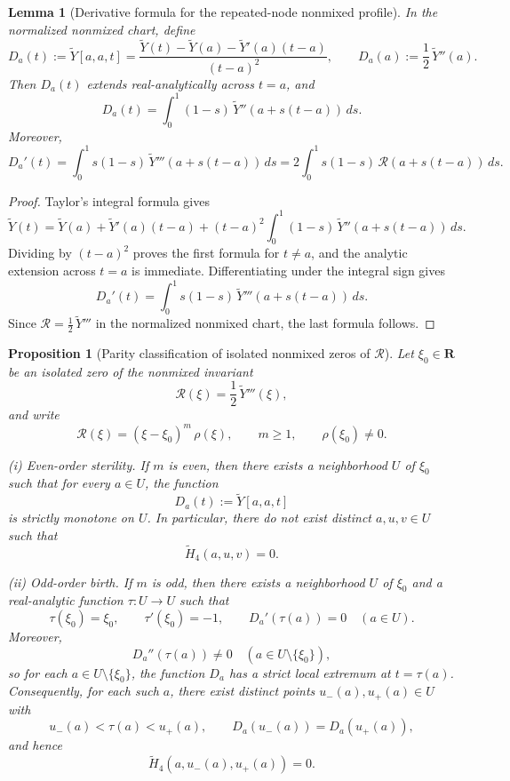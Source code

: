 \documentclass[11pt,a4paper]{amsart}
\theoremstyle{plain}
\newtheorem{proposition}[theorem]{Proposition}
\newtheorem{lemma}[theorem]{Lemma}
\theoremstyle{definition}
\begin{document}
\begin{lemma}[Derivative formula for the repeated-node nonmixed profile]
\label{lem:Da-derivative-formula}
In the normalized nonmixed chart, define
\[
D_a(t):=\widetilde Y[a,a,t]
=
\frac{\widetilde Y(t)-\widetilde Y(a)-\widetilde Y'(a)(t-a)}{(t-a)^2},
\qquad
D_a(a):=\frac12\,\widetilde Y''(a).
\]
Then $D_a(t)$ extends real-analytically across $t=a$, and
\[
D_a(t)=\int_0^1 (1-s)\,\widetilde Y''(a+s(t-a))\,ds.
\]
Moreover,
\[
D_a'(t)
=
\int_0^1 s(1-s)\,\widetilde Y'''(a+s(t-a))\,ds
=
2\int_0^1 s(1-s)\,\mathcal R(a+s(t-a))\,ds.
\]
\end{lemma}

\begin{proof}
Taylor's integral formula gives
\[
\widetilde Y(t)
=
\widetilde Y(a)+\widetilde Y'(a)(t-a)
+(t-a)^2\int_0^1 (1-s)\,\widetilde Y''(a+s(t-a))\,ds.
\]
Dividing by $(t-a)^2$ proves the first formula for $t\neq a$, and the
analytic extension across $t=a$ is immediate. Differentiating under the
integral sign gives
\[
D_a'(t)
=
\int_0^1 s(1-s)\,\widetilde Y'''(a+s(t-a))\,ds.
\]
Since $\mathcal R=\frac12\,\widetilde Y'''$ in the normalized nonmixed chart,
the last formula follows.
\end{proof}

\begin{proposition}[Parity classification of isolated nonmixed zeros of $\mathcal R$]
\label{prop:parity-classification-isolated-nonmixed-R-zeros}
Let $\xi_0\in\mathbf R$ be an isolated zero of the nonmixed invariant
\[
\mathcal R(\xi)=\frac12\,\widetilde Y'''(\xi),
\]
and write
\[
\mathcal R(\xi)=(\xi-\xi_0)^m\,\rho(\xi),
\qquad
m\ge 1,
\qquad
\rho(\xi_0)\neq 0.
\]

\smallskip

\noindent
\emph{(i) Even-order sterility.}
If $m$ is even, then there exists a neighborhood $U$ of $\xi_0$ such that
for every $a\in U$, the function
\[
D_a(t):=\widetilde Y[a,a,t]
\]
is strictly monotone on $U$. In particular, there do not exist distinct
$a,u,v\in U$ such that
\[
\widetilde H_4(a,u,v)=0.
\]

\smallskip

\noindent
\emph{(ii) Odd-order birth.}
If $m$ is odd, then there exists a neighborhood $U$ of $\xi_0$ and a
real-analytic function $\tau:U\to U$ such that
\[
\tau(\xi_0)=\xi_0,
\qquad
\tau'(\xi_0)=-1,
\qquad
D_a'(\tau(a))=0
\quad (a\in U).
\]
Moreover,
\[
D_a''(\tau(a))\neq 0
\quad (a\in U\setminus\{\xi_0\}),
\]
so for each $a\in U\setminus\{\xi_0\}$, the function $D_a$ has a strict
local extremum at $t=\tau(a)$. Consequently, for each such $a$, there exist
distinct points $u_-(a),u_+(a)\in U$ with
\[
u_-(a)<\tau(a)<u_+(a),
\qquad
D_a(u_-(a))=D_a(u_+(a)),
\]
and hence
\[
\widetilde H_4(a,u_-(a),u_+(a))=0.
\]
\end{proposition}
\end{document}
